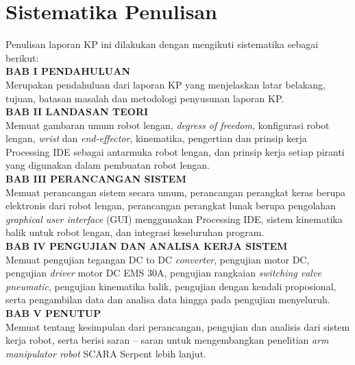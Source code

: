 \section{Sistematika Penulisan}
Penulisan laporan KP ini dilakukan dengan mengikuti sistematika sebagai berikut:\\
\noindent
\textbf{BAB I\hspace*{0.6cm} PENDAHULUAN}\\
\noindent
Merupakan pendahuluan dari laporan KP yang menjelaskan latar belakang, tujuan, batasan masalah dan metodologi penyusunan laporan KP.\\
\noindent
\textbf{BAB II\hspace*{0.5cm} LANDASAN TEORI}\\
\noindent
Memuat gambaran umum robot lengan, \emph {degress of freedom}, konfigurasi robot lengan, \emph{wrist} dan \textit{end-effector}, kinematika, pengertian dan prinsip kerja Processing IDE sebagai antarmuka robot lengan, dan prinsip kerja setiap piranti yang digunakan dalam pembuatan robot lengan. \\
\textbf{BAB III\hspace*{0.375cm}  PERANCANGAN SISTEM}\\
\noindent
Memuat perancangan sistem secara umum, perancangan perangkat keras berupa elektronis dari robot lengan, perancangan perangkat lunak berupa pengolahan \textit{graphical user interface} (GUI) menggunakan Processing IDE, sistem kinematika balik untuk robot lengan, dan integrasi keseluruhan program. \\
\textbf{BAB IV\hspace*{0.4cm}  PENGUJIAN DAN ANALISA KERJA SISTEM }\\
\noindent
Memuat pengujian tegangan DC to DC \textit{converter}, pengujian motor DC, pengujian \textit{driver} motor DC EMS 30A, pengujian rangkaian \textit{switching valve pneumatic}, pengujian kinematika balik, pengujian dengan kendali proposional, serta pengambilan data dan analisa data hingga pada pengujian menyeluruh.\\
\textbf{BAB V\hspace*{0.6cm} PENUTUP}\\
Memuat tentang kesimpulan dari perancangan, pengujian dan analisis dari sistem kerja robot, serta berisi saran – saran untuk mengembangkan penelitian \emph{ arm manipulator robot} SCARA Serpent lebih lanjut. \\